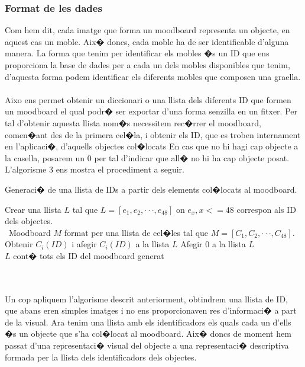 \documentclass[12pt,a4paper,openright,oneside]{article}
\numberwithin{equation}{section}
\theoremstyle{definition}
\begin{document}
\subsubsection{Format de les dades}
Com hem dit, cada imatge que forma un moodboard representa un objecte, en aquest cas un moble. Aix� doncs, cada moble ha de ser identificable d'alguna manera. La forma que tenim per identificar els mobles �s un ID que ens proporciona la base de dades per a cada un dels mobles disponibles que tenim, d'aquesta forma podem identificar els diferents mobles que composen una graella.\\\\
Aixo ens permet obtenir un diccionari o una llista dels diferents ID que formen un moodboard el qual podr� ser exportar d'una forma senzilla en un fitxer. Per tal d'obtenir aquesta llista nom�s necessitem rec�rrer el moodboard, comen�ant des de la primera cel�la, i obtenir els ID, que es troben internament en l'aplicaci�, d'aquells objectes col�locats En cas que no hi hagi cap objecte a la casella, posarem un 0 per tal d'indicar que all� no hi ha cap objecte posat. L'algorisme 3 ens mostra el procediment a seguir.
\begin{algorithm}
\caption{Generaci� de una llista de IDs a partir dels elements col�locats al moodboard.}
\begin{algorithmic} 
\STATE Crear una llista ${L}$ tal que ${L = [e_1, e_2, \cdot \cdot \cdot, e_{48}]}$ on ${e_x, x <= 48}$ correspon als ID dels objectes.\\\ Moodboard ${M}$ format per una llista de cel�les tal que ${M = [C_1,C_2, \cdot \cdot \cdot, C_{48}]}$.
\STATE Obtenir ${C_i (ID)}$ i afegir ${C_i (ID)}$ a la llista ${L}$
\ELSE
\STATE Afegir 0 a la llista ${L}$
\ENDIF
\ENDFOR \\
${L}$ cont� tots els ID del moodboard generat
\end{algorithmic}
\end{algorithm}
\\\\ Un cop apliquem l'algorisme descrit anteriorment, obtindrem una llista de ID, que abans eren simples imatges i no ens proporcionaven res d'informaci� a part de la visual. Ara tenim una llista amb els identificadors els quals cada un d'ells �s un objecte que s'ha col�locat al moodboard. Aix� doncs de moment hem passat d'una representaci� visual del objecte a una representaci� descriptiva formada per la llista dels identificadors dels objectes. \\\
\end{document}
